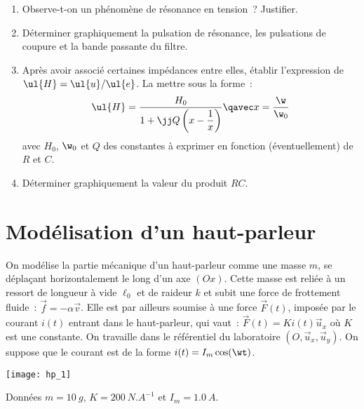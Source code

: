 \documentclass[a4paper, 12pt, final, garamond]{book}
\begin{document}
\begin{enumerate}[start=2]
    \item Observe-t-on un phénomène de résonance en tension~? Justifier.
    \item Déterminer graphiquement la pulsation de résonance, les pulsations de
        coupure et la bande passante du filtre.
    \item Après avoir associé certaines impédances entre elles, établir
        l'expression de $\ul{H} = \ul{u} / \ul{e}$. La
        mettre sous la forme~:
        \[
            \ul{H}
                = \dfrac{H_0}{1 + \jj Q\left(x - \dfrac{1}{x}\right)}
            \qavec
            x = \dfrac{\w}{\w_0}
        \]
        avec $H_0$, $\w_0$ et $Q$ des constantes à exprimer en fonction
        (éventuellement) de $R$ et $C$.
    \item Déterminer graphiquement la valeur du produit $RC$.
\end{enumerate}

\section{Modélisation d'un haut-parleur}

\begin{minipage}{0.55\linewidth}
    On modélise la partie mécanique d'un haut-parleur comme une masse $m$, se
    déplaçant horizontalement le long d'un axe $(Ox)$. Cette masse est reliée
    à un ressort de longueur à vide $\ell_0$ et de raideur $k$ et subit une
    force de frottement fluide~: $\vec{f} = -\alpha \vec{v}$. Elle est par
    ailleurs soumise à une force $\vec{F}(t)$, imposée par le courant $i(t)$
    entrant dans le haut-parleur, qui vaut~: $\vec{F}(t) = K i(t) \vec{u}_x$
    où $K$ est une constante. On travaille dans le référentiel du laboratoire
    $(O, \vec{u}_x , \vec{u}_y)$. On suppose que le courant est de la forme
    $i(t) = I_m \cos(\wt)$.
\end{minipage}
\hfill
\begin{minipage}{0.45\linewidth}
    \begin{center}
        \texttt{[image: hp\_1]}
    \end{center}
\end{minipage}

\begin{rdefi}{Données}
    $m = \SI{10}{g}$, $K = \SI{200}{N.A^{-1}}$ et $I_m = \SI{1.0}{A}$.
\end{rdefi}
\end{document}
